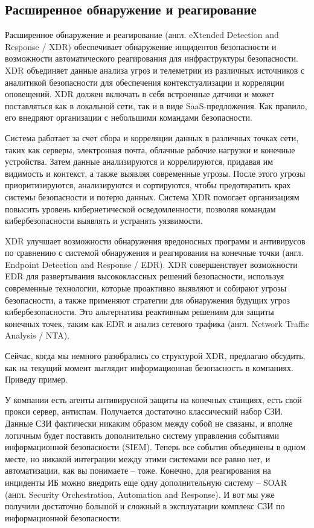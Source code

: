 \subsection{Расширенное обнаружение и реагирование}

Расширенное обнаружение и реагирование (англ. eXtended Detection and Response / XDR) обеспечивает обнаружение инцидентов безопасности и возможности автоматического реагирования для инфраструктуры безопасности. XDR объединяет данные анализа угроз и телеметрии из различных источников с аналитикой безопасности для обеспечения контекстуализации и корреляции оповещений. XDR должен включать в себя встроенные датчики и может поставляться как в локальной сети, так и в виде SaaS-предложения. Как правило, его внедряют организации с небольшими командами безопасности.

Система работает за счет сбора и корреляции данных в различных точках сети, таких как серверы, электронная почта, облачные рабочие нагрузки и конечные устройства. Затем данные анализируются и коррелируются, придавая им видимость и контекст, а также выявляя современные угрозы. После этого угрозы приоритизируются, анализируются и сортируются, чтобы предотвратить крах системы безопасности и потерю данных. Система XDR помогает организациям повысить уровень кибернетической осведомленности, позволяя командам кибербезопасности выявлять и устранять уязвимости.

XDR улучшает возможности обнаружения вредоносных программ и антивирусов по сравнению с системой обнаружения и реагирования на конечные точки (англ. Endpoint Detection and Response / EDR). XDR совершенствует возможности EDR для развертывания высококлассных решений безопасности, используя современные технологии, которые проактивно выявляют и собирают угрозы безопасности, а также применяют стратегии для обнаружения будущих угроз кибербезопасности. Это альтернатива реактивным решениям для защиты конечных точек, таким как EDR и анализ сетевого трафика (англ. Network Traffic Analysis / NTA).

Сейчас, когда мы немного разобрались со структурой XDR, предлагаю обсудить, как на текущий момент выглядит информационная безопасность в компаниях. Приведу пример.

У компании есть агенты антивирусной защиты на конечных станциях, есть свой прокси сервер, антиспам. Получается достаточно классический набор СЗИ. Данные СЗИ фактически никаким образом между собой не связаны, и вполне логичным будет поставить дополнительно систему управления событиями информационной безопасности (SIEM). Теперь все события объединены в одном месте, но никакой интеграции между этими системами все равно нет, и автоматизации, как вы понимаете – тоже. Конечно, для реагирования на инциденты ИБ можно внедрить еще одну дополнительную систему – SOAR (англ. Security Orchestration, Automation and Response). И вот мы уже получили достаточно большой и сложный в эксплуатации комплекс СЗИ по информационной безопасности.

